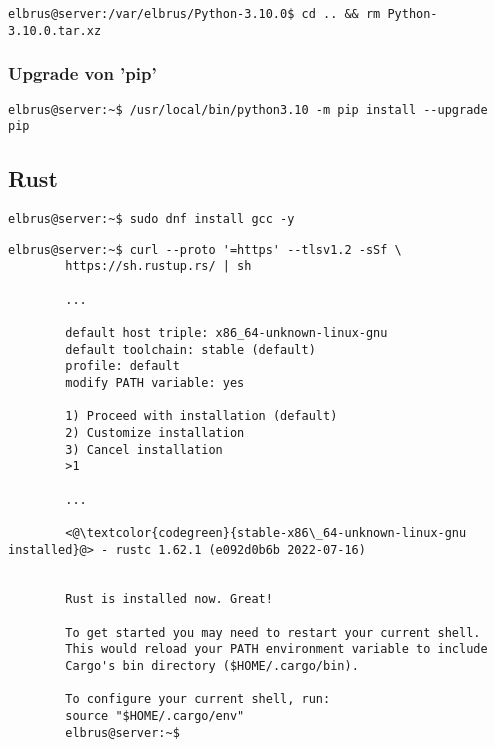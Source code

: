 \documentclass{article}
\begin{document}
	\lstset{style=commands}
	\begin{lstlisting}[caption={Löschen der kompremierten Python Datei.}]
		elbrus@server:/var/elbrus/Python-3.10.0$ cd .. && rm Python-3.10.0.tar.xz
	\end{lstlisting}

	\subsubsection{Upgrade von 'pip'}

	\lstset{style=commands}
	\begin{lstlisting}[caption={Upgraden von 'pip'.}]
		elbrus@server:~$ /usr/local/bin/python3.10 -m pip install --upgrade pip
	\end{lstlisting}

	\subsection{Rust}
	
	\lstset{style=commands}
	\begin{lstlisting}[caption={Installieren von GNU Compiler Collection.}]
		elbrus@server:~$ sudo dnf install gcc -y
	\end{lstlisting}
	
	\lstset{style=commands}
	\begin{lstlisting}[caption={Installieren von Rust.}]
		elbrus@server:~$ curl --proto '=https' --tlsv1.2 -sSf \
		https://sh.rustup.rs/ | sh
		 
		...
		 
		default host triple: x86_64-unknown-linux-gnu
		default toolchain: stable (default)
		profile: default
		modify PATH variable: yes
		
		1) Proceed with installation (default)
		2) Customize installation
		3) Cancel installation
		>1
		
		...
		
		<@\textcolor{codegreen}{stable-x86\_64-unknown-linux-gnu installed}@> - rustc 1.62.1 (e092d0b6b 2022-07-16)
		
		
		Rust is installed now. Great!
		
		To get started you may need to restart your current shell.
		This would reload your PATH environment variable to include
		Cargo's bin directory ($HOME/.cargo/bin).
		
		To configure your current shell, run:
		source "$HOME/.cargo/env"
		elbrus@server:~$
	\end{lstlisting}
	
\end{document}
